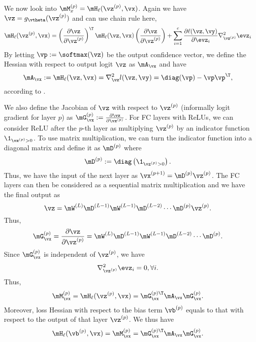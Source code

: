 We now look into $\mM_x^{(p)} = \mH_\ell(\vz^{(p)}, \vx)$. Again we have $\vz = g_\vtheta(\vz^{(p)})$ and can use chain rule here,
\begin{equation}
    \mH_\ell(\vz^{(p)}, \vx) = \left(\frac{\partial \vz}{\partial\vz^{(p)}}\right)^\T\mH_\ell(\vz, \vx)\left(\frac{\partial \vz}{\partial\vz^{(p)}}\right) + \sum_{i=1}^{c} \frac{\partial \ell(\vz, \vy)}{\partial\evz_i} \nabla^2_{\vz^{(p)}} \evz_i
\end{equation}
By letting $\vp := \softmax(\vz)$ be the output confidence vector, we define the Hessian with respect to output logit $\vz$ as $\mA_\vx$ and have
\begin{equation}
    \label{eqn:hessian_decomp_general}
    \mA_\vx := \mH_\ell(\vz, \vx) = \nabla^2_\vz l(\vz,\vy)= \diag(\vp)- \vp\vp^\T,
\end{equation}
according to \citet{singla2019understanding}.

We also define the Jacobian of $\vz$ with respect to $\vz^{(p)}$ (informally logit gradient for layer $p$) as $\mG^{(p)}_\vx := \frac{\partial \vz}{\partial\vz^{(p)}}$.
For FC layers with ReLUs, we can consider ReLU after the $p$-th layer as multiplying $\vz^{(p)}$ by an indicator function $\1_{\vz^{(p)} > 0}$. To use matrix multiplication, we can turn the indicator function into a diagonal matrix and define it as $\mD^{(p)}$ where
\begin{equation}
    \mD^{(p)} := \diag\left(\1_{\vz^{(p)} > 0}\right).
\end{equation}
Thus, we have the input of the next layer as $\vx^{(p+1)} = \mD^{(p)}\vz^{(p)}$.
The FC layers can then be considered as a sequential matrix multiplication and we have the final output as
\begin{equation}
    \vz = \mW^{(L)}\mD^{(L-1)}\mW^{(L-1)}\mD^{(L-2)}\cdots \mD^{(p)}\vz^{(p)}.
\end{equation}
Thus, \begin{equation}
    \mG_\vx^{(p)} = \frac{\partial \vz}{\partial\vz^{(p)}} = \mW^{(L)}\mD^{(L-1)}\mW^{(L-1)}\mD^{(L-2)}\cdots \mD^{(p)}.
\end{equation}
Since $\mG_\vx^{(p)}$ is independent of $\vz^{(p)}$, we have
\begin{equation}
    \nabla^2_{\vz^{(p)}} \evz_i = 0, \forall i.
    \label{eqn:appendix_zero_logit_output_hessian}
\end{equation}
Thus, \begin{equation}
    \mM_\vx^{(p)} = \mH_\ell(\vz^{(p)}, \vx) = \mG_\vx^{(p)\T}\mA_\vx\mG_\vx^{(p)}.
\end{equation}
Moreover, loss Hessian with respect to the bias term $\vb^{(p)}$ equals to that with respect to the output of that layer $\vz^{(p)}$. We thus have
\begin{equation}
    \mH_\ell(\vb^{(p)}, \vx) = \mM_\vx^{(p)} = \mG_\vx^{(p)\T}\mA_\vx\mG_\vx^{(p)}.
\end{equation}

